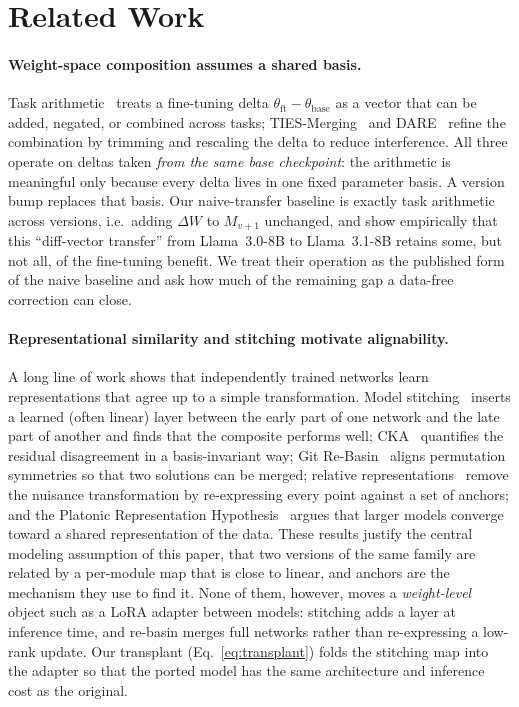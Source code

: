 \section{Related Work}
\label{sec:related}

\paragraph{Weight-space composition assumes a shared basis.}
Task arithmetic~\citep{ilharco2023taskvectors} treats a fine-tuning delta
$\theta_{\mathrm{ft}}-\theta_{\mathrm{base}}$ as a vector that can be added,
negated, or combined across tasks; TIES-Merging~\citep{yadav2023ties} and
DARE~\citep{yu2024dare} refine the combination by trimming and rescaling the
delta to reduce interference. All three operate on deltas taken \emph{from the
same base checkpoint}: the arithmetic is meaningful only because every delta
lives in one fixed parameter basis. A version bump replaces that basis. Our
naive-transfer baseline is exactly task arithmetic across versions, i.e.\ adding
$\Delta W$ to $M_{v+1}$ unchanged, and
\citet{lin2025finetuningtransfer} show empirically that this ``diff-vector
transfer'' from Llama~3.0-8B to Llama~3.1-8B retains some, but not all, of the
fine-tuning benefit. We treat their operation as the published form of the naive
baseline and ask how much of the remaining gap a data-free correction can
close.

\paragraph{Representational similarity and stitching motivate alignability.}
A long line of work shows that independently trained networks learn
representations that agree up to a simple transformation. Model
stitching~\citep{lenc2015stitching,bansal2021stitching,csiszarik2021stitching}
inserts a learned (often linear) layer between the early part of one network
and the late part of another and finds that the composite performs well;
CKA~\citep{kornblith2019cka} quantifies the residual disagreement in a
basis-invariant way; Git Re-Basin~\citep{ainsworth2023gitrebasin} aligns
permutation symmetries so that two solutions can be merged; relative
representations~\citep{moschella2023relative} remove the nuisance
transformation by re-expressing every point against a set of anchors; and the
Platonic Representation Hypothesis~\citep{huh2024platonic} argues that larger
models converge toward a shared representation of the data. These results
justify the central modeling assumption of this paper, that two versions of the
same family are related by a per-module map that is close to linear, and
anchors are the mechanism they use to find it. None of them, however, moves a
\emph{weight-level} object such as a LoRA adapter between models: stitching
adds a layer at inference time, and re-basin merges full networks rather than
re-expressing a low-rank update. Our transplant
(Eq.~\ref{eq:transplant}) folds the stitching map into the adapter so that the
ported model has the same architecture and inference cost as the original.

